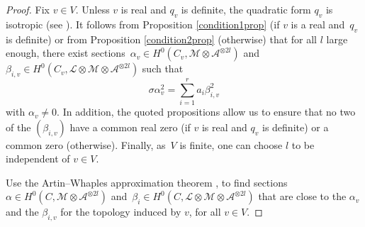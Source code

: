 \documentclass{amsart}
\theoremstyle{definition}
\theoremstyle{remark}
\numberwithin{equation}{section}
\def\cA{\mathcal{A}}
\def\cM{\mathcal{M}}
\def\cL{\mathcal{L}}
\def\cM{\mathcal{M}}
\begin{document}
\begin{proof}
Fix $v\in V$. Unless $v$ is real and $q_v$ is definite, the quadratic form $q_v$ is isotropic (see \cite[VI.2.12]{Lam}). It follows from Proposition \ref{condition1prop} (if $v$ is a real and~$q_v$ is definite) or from Proposition \ref{condition2prop} (otherwise) that for all $l$ large enough, there exist sections~$\alpha_v\in H^0(C_v,\cM\otimes\cA^{\otimes 2l})$ and~$\beta_{i,v}\in H^0(C_v,\cL\otimes\cM\otimes\cA^{\otimes 2l})$ such that
\begin{equation}
\sigma\alpha_v^2=\sum_{i=1}^ra_i\beta_{i,v}^2
\end{equation}
with $\alpha_v\neq 0$. In addition, the quoted propositions allow us to ensure that no two of the $(\beta_{i,v})$ have a common real zero (if $v$ is real and $q_v$ is definite) or a common zero (otherwise).
Finally, as~$V$ is finite, one can choose $l$ to be independent of $v\in V$.

Use the Artin--Whaples approximation theorem \cite[Theorem 1]{AW},
to find sections $\alpha\in H^0(C,\cM\otimes\cA^{\otimes 2l})$ and~$\beta_{i}\in H^0(C,\cL\otimes\cM\otimes\cA^{\otimes 2l})$ that are close to the $\alpha_v$ and the $\beta_{i,v}$ for the topology induced by $v$, for all $v\in V$.


\end{proof}
\end{document}
